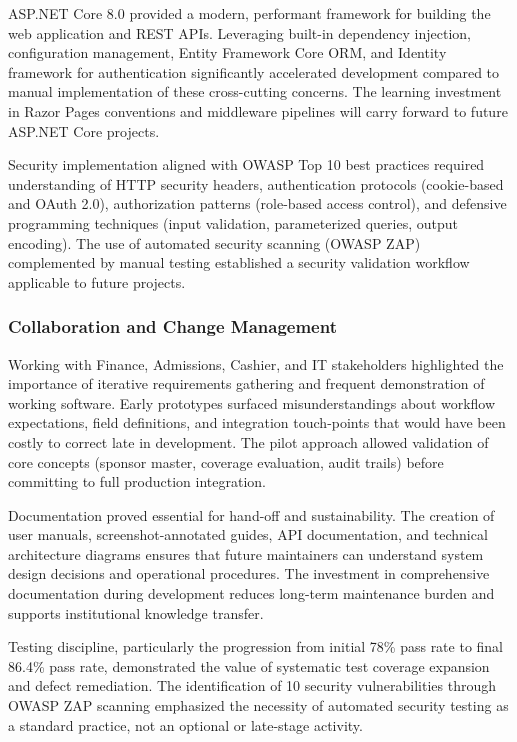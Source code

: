ASP.NET Core 8.0 provided a modern, performant framework for building the web application and REST APIs. Leveraging built-in dependency injection, configuration management, Entity Framework Core ORM, and Identity framework for authentication significantly accelerated development compared to manual implementation of these cross-cutting concerns. The learning investment in Razor Pages conventions and middleware pipelines will carry forward to future ASP.NET Core projects.

Security implementation aligned with OWASP Top 10 best practices required understanding of HTTP security headers, authentication protocols (cookie-based and OAuth 2.0), authorization patterns (role-based access control), and defensive programming techniques (input validation, parameterized queries, output encoding). The use of automated security scanning (OWASP ZAP) complemented by manual testing established a security validation workflow applicable to future projects.

\subsubsection{Collaboration and Change Management}

Working with Finance, Admissions, Cashier, and IT stakeholders highlighted the importance of iterative requirements gathering and frequent demonstration of working software. Early prototypes surfaced misunderstandings about workflow expectations, field definitions, and integration touch-points that would have been costly to correct late in development. The pilot approach allowed validation of core concepts (sponsor master, coverage evaluation, audit trails) before committing to full production integration.

Documentation proved essential for hand-off and sustainability. The creation of user manuals, screenshot-annotated guides, API documentation, and technical architecture diagrams ensures that future maintainers can understand system design decisions and operational procedures. The investment in comprehensive documentation during development reduces long-term maintenance burden and supports institutional knowledge transfer.

Testing discipline, particularly the progression from initial 78\% pass rate to final 86.4\% pass rate, demonstrated the value of systematic test coverage expansion and defect remediation. The identification of 10 security vulnerabilities through OWASP ZAP scanning emphasized the necessity of automated security testing as a standard practice, not an optional or late-stage activity.


